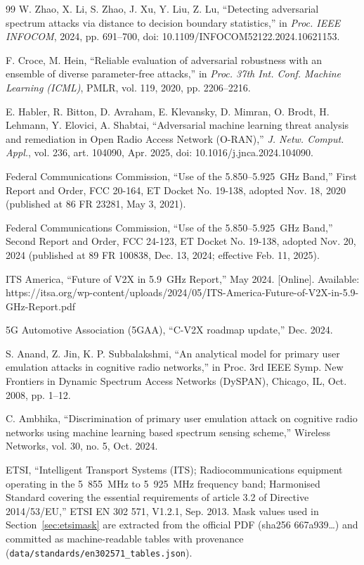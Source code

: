 \documentclass[review]{elsarticle}
\begin{document}
\begin{thebibliography}{99}
 W. Zhao, X. Li, S. Zhao, J. Xu, Y. Liu, Z. Lu,
``Detecting adversarial spectrum attacks via distance to decision boundary
statistics,'' in \emph{Proc. IEEE INFOCOM}, 2024, pp. 691--700,
doi: 10.1109/INFOCOM52122.2024.10621153.

 F. Croce, M. Hein, ``Reliable evaluation of adversarial
robustness with an ensemble of diverse parameter-free attacks,'' in
\emph{Proc. 37th Int. Conf. Machine Learning (ICML)}, PMLR, vol. 119, 2020,
pp. 2206--2216.

 E. Habler, R. Bitton, D. Avraham, E. Klevansky,
D. Mimran, O. Brodt, H. Lehmann, Y. Elovici, A. Shabtai, ``Adversarial
machine learning threat analysis and remediation in Open Radio Access
Network (O-RAN),'' \emph{J. Netw. Comput. Appl.}, vol. 236, art. 104090,
Apr. 2025, doi: 10.1016/j.jnca.2024.104090.

 Federal Communications Commission, ``Use of the
5.850--5.925~GHz Band,'' First Report and Order, FCC 20-164, ET Docket
No. 19-138, adopted Nov. 18, 2020 (published at 86 FR 23281, May 3, 2021).

 Federal Communications Commission, ``Use of the
5.850--5.925~GHz Band,'' Second Report and Order, FCC 24-123, ET Docket
No. 19-138, adopted Nov. 20, 2024 (published at 89 FR 100838, Dec. 13,
2024; effective Feb. 11, 2025).

 ITS America, ``Future of V2X in 5.9~GHz Report,''
May 2024. [Online]. Available:
https://itsa.org/wp-content/uploads/2024/05/ITS-America-Future-of-V2X-in-5.9-GHz-Report.pdf

 5G Automotive Association (5GAA), ``C-V2X roadmap
update,'' Dec. 2024.

 S. Anand, Z. Jin, K. P. Subbalakshmi, ``An analytical
model for primary user emulation attacks in cognitive radio networks,'' in
Proc. 3rd IEEE Symp. New Frontiers in Dynamic Spectrum Access Networks
(DySPAN), Chicago, IL, Oct. 2008, pp. 1--12.

 C. Ambhika, ``Discrimination of primary user
emulation attack on cognitive radio networks using machine learning based
spectrum sensing scheme,'' Wireless Networks, vol. 30, no. 5, Oct. 2024.

 ETSI, ``Intelligent Transport Systems (ITS);
Radiocommunications equipment operating in the 5~855~MHz to 5~925~MHz
frequency band; Harmonised Standard covering the essential requirements of
article 3.2 of Directive 2014/53/EU,'' ETSI EN 302 571, V1.2.1, Sep. 2013.
Mask values used in Section~\ref{sec:etsimask} are extracted from the
official PDF (sha256 667a939\ldots) and committed as machine-readable
tables with provenance (\texttt{data/standards/en302571\_tables.json}).


\end{thebibliography}
\end{document}
